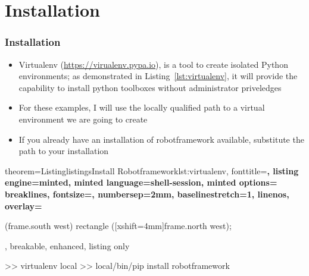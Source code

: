 \documentclass[xcolor=table,handout]{beamer}
\newcounter{listings}
\begin{document}
\section{Installation}

\begin{frame}[fragile]\frametitle{Installation}

    \begin{itemize}
        \item Virtualenv (\url{https://virualenv.pypa.io}), is a tool to create isolated Python environments; as demonstrated in Listing~\ref{lst:virtualenv}, it will provide the capability to install python toolboxes without administrator priveledges
        \item For these examples, I will use the locally qualified path to a virtual environment we are going to create
        \item If you already have an installation of robotframework available, substitute the path to your installation
    \end{itemize}
\vfill
\begin{tcblisting}{%
     theorem={Listing}{listings}{Install Robotframework}{lst:virtualenv},
     fonttitle=\scriptsize\bfseries,
     listing engine=minted,
     minted language=shell-session,
     minted options={%
         breaklines,
         fontsize=\tiny,
         numbersep=2mm,
         baselinestretch=1,
         linenos},
     overlay={%
       \begin{tcbclipinterior}
           \fill[gray!25] (frame.south west) rectangle ([xshift=4mm]frame.north west);
       \end{tcbclipinterior}},
     breakable, enhanced, listing only}
>> virtualenv local
>> local/bin/pip install robotframework
\end{tcblisting}
\end{frame}
\end{document}

